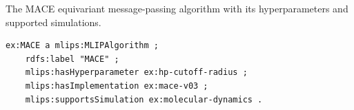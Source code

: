 The MACE equivariant message-passing algorithm with its hyperparameters and supported simulations.
\begin{lstlisting}[language=turtle]
ex:MACE a mlips:MLIPAlgorithm ;
    rdfs:label "MACE" ;
    mlips:hasHyperparameter ex:hp-cutoff-radius ;
    mlips:hasImplementation ex:mace-v03 ;
    mlips:supportsSimulation ex:molecular-dynamics .
\end{lstlisting}
